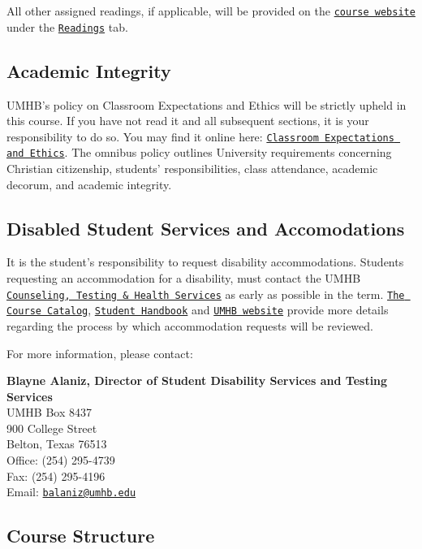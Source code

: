 \documentclass[
]{article}
\begin{document}
All other assigned readings, if applicable, will be provided on the
\texttt{\href{https://mycourses.umhb.edu/courses/23592}{course website}}
under the
\texttt{\href{https://mycourses.umhb.edu/courses/23592/files/folder/Readings}{Readings}}
tab.

\subsection{Academic Integrity}

UMHB's policy on Classroom Expectations and Ethics will be strictly
upheld in this course. If you have not read it and all subsequent
sections, it is your responsibility to do so. You may find it online
here:
\href{http://catalog.umhb.edu/2019-2020/Graduate-Catalog/Classroom-Expectations-and-Ethics}{\texttt{Classroom Expectations and Ethics}}.
The omnibus policy outlines University requirements concerning Christian
citizenship, students' responsibilities, class attendance, academic
decorum, and academic integrity.

\subsection{Disabled Student Services and Accomodations}

It is the student's responsibility to request disability accommodations.
Students requesting an accommodation for a disability, must contact the
UMHB
\href{http://cths.umhb.edu/disability}{\texttt{Counseling, Testing \& Health Services}}
as early as possible in the term.
\href{http://catalog.umhb.edu/en/2019-2020/Graduate-Catalog}{\texttt{The Course Catalog}},
\href{http://students.umhb.edu/student-handbook}{\texttt{Student Handbook}}
and \href{https://go.umhb.edu/}{\texttt{UMHB website}} provide more
details regarding the process by which accommodation requests will be
reviewed.

For more information, please contact:

\textbf{Blayne Alaniz, Director of Student Disability Services and
Testing Services}\\
UMHB Box 8437\\
900 College Street\\
Belton, Texas 76513\\
Office: (254) 295-4739\\
Fax: (254) 295-4196\\
Email: \texttt{\href{mailto:balaniz@umhb.edu}{balaniz@umhb.edu}}

\subsection{Course Structure}
\end{document}
